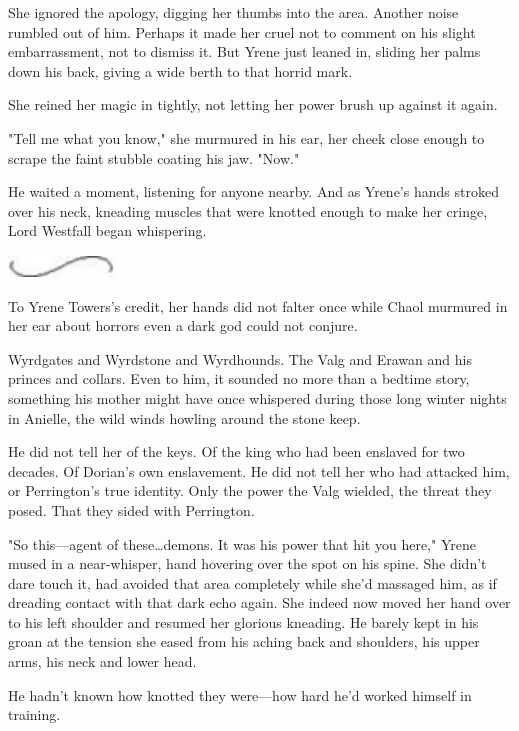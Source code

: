 She ignored the apology, digging her thumbs into the area.
Another noise rumbled out of him.
Perhaps it made her cruel not to comment on his slight embarrassment, not to dismiss it.
But Yrene just leaned in, sliding her palms down his back, giving a wide berth to that horrid mark.

She reined her magic in tightly, not letting her power brush up against it again.

"Tell me what you know," she murmured in his ear, her cheek close enough to scrape the faint stubble coating his jaw.
"Now."

He waited a moment, listening for anyone nearby.
And as Yrene's hands stroked over his neck, kneading muscles that were knotted enough to make her cringe, Lord Westfall began whispering.

\begin{center}
	\includegraphics[width=1.12in,height=0.24in]{images/seperator}
\end{center}

To Yrene Towers's credit, her hands did not falter once while Chaol murmured in her ear about horrors even a dark god could not conjure.

Wyrdgates and Wyrdstone and Wyrdhounds.
The Valg and Erawan and his princes and collars.
Even to him, it sounded no more than a bedtime story, something his mother might have once whispered during those long winter nights in Anielle, the wild winds howling around the stone keep.

He did not tell her of the keys.
Of the king who had been enslaved for two decades.
Of Dorian's own enslavement.
He did not tell her who had attacked him, or Perrington's true identity.
Only the power the Valg wielded, the threat they posed.
That they sided with Perrington.

"So this---agent of these\ldots demons.
It was his power that hit you here," Yrene mused in a near-whisper, hand hovering over the spot on his spine.
She didn't dare touch it, had avoided that area completely while she'd massaged him, as if dreading contact with that dark echo again.
She indeed now moved her hand over to his left shoulder and resumed her glorious kneading.
He barely kept in his groan at the tension she eased from his aching back and shoulders, his upper arms, his neck and lower head.

He hadn't known how knotted they were---how hard he'd worked himself in training.

